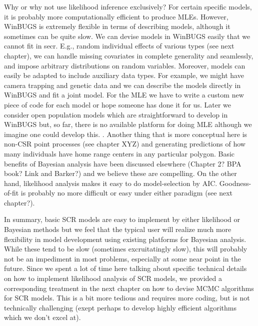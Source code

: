 Why or why not use likelihood inference exclusively? For certain
specific models, it is probably more computationally efficient to
produce MLEs. However, WinBUGS is extremely flexible in terms of
describing models, although it sometimes can be quite slow. We can
devise models in WinBUGS easily that we cannot fit in secr. E.g.,
random individual effects of various types (see next chapter), we can
handle missing covariates in complete generality and seamlessly, and
impose arbitrary distributions on random variables. Moreover, models
can easily be adapted to include auxiliary data types. For example, we
might have camera trapping and genetic data and we can describe the
models directly in WinBUGS and fit a joint model. For the MLE we have
to write a custom new piece of code for each model or hope someone has
done it for us.  Later we consider open population models which are
straightforward to develop in WinBUGS but, so far, there is no
available platform for doing MLE although we imagine one could develop
this. . Another thing that is more conceptual here is non-CSR point
processes (see chapter XYZ) and generating predictions of how many
individuals have home range centers in any particular polygon.  Basic
benefits of Bayesian analysis have been discussed elsewhere (Chapter
2? BPA book? Link and Barker?) and we believe these are compelling. On
the other hand, likelihood analysis makes it easy to do
model-selection by AIC. Goodness-of-fit is probably no more difficult
or easy under either paradigm (see next chapter?).

In summary, basic SCR models are easy to implement by either
likelihood or Bayesian methods but we feel that the typical user will
realize much more flexibility in model development using existing
platforms for Bayesian analysis. While these tend to be slow
(sometimes excruitatingly slow), this will probably not be an
impediment in most problems, especially at some near point in the
future.  Since we spent a lot of time here talking about specific
technical details on how to implement likelihood analysis of SCR
models, we provided a corresponding treatment in the next chapter on
how to devise MCMC algorithms for SCR models. This is a bit more
tedious and requires more coding, but is not technically challenging
(exept perhaps to develop highly efficient algorithms which we don’t
excel at).



